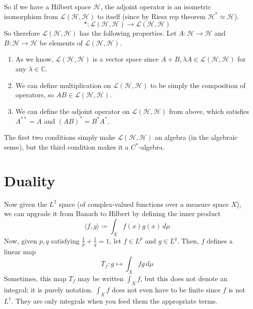 \documentclass{article}
\theoremstyle{remark}
\theoremstyle{definition}
\begin{document}
So if we have a Hilbert space $\mathcal{H}$, the adjoint operator is an isometric isomorphism from $\mathcal{L}(\mathcal{H}, \mathcal{H})$ to itself (since by Riesz rep theorem $\mathcal{H}^* \simeq \mathcal{H}$). 
\[\ast : \mathcal{L}(\mathcal{H}, \mathcal{H}) \longrightarrow \mathcal{L}(\mathcal{H}, \mathcal{H})\]
So therefore $\mathcal{L}(\mathcal{H}, \mathcal{H})$ has the following properties. Let $A: \mathcal{H} \longrightarrow \mathcal{H}$ and $B: \mathcal{H} \longrightarrow \mathcal{H}$ be elements of $\mathcal{L}(\mathcal{H}, \mathcal{H})$. 
\begin{enumerate}
    \item As we know, $\mathcal{L}(\mathcal{H}, \mathcal{H})$ is a vector space since $A + B, \lambda A \in \mathcal{L}(\mathcal{H}, \mathcal{H})$ for any $\lambda \in \mathbb{C}$. 
    \item We can define multiplication on $\mathcal{L}(\mathcal{H}, \mathcal{H})$ to be simply the composition of operators, so $AB \in \mathcal{L}(\mathcal{H}, \mathcal{H})$. 
    \item We can define the adjoint operator on $\mathcal{L}(\mathcal{H}, \mathcal{H})$ from above, which satisfies $A^{**} = A$ and $(AB)^* = B^* A^*$. 
\end{enumerate}
The first two conditions simply make $\mathcal{L}(\mathcal{H}, \mathcal{H})$ an algebra (in the algebraic sense), but the third condition makes it a $C^*$-algebra. 

\section{Duality}
Now given the $L^2$ space (of complex-valued functions over a measure space $X$), we can upgrade it from Banach to Hilbert by defining the inner product 
\[\langle f, g \rangle \coloneqq \int_X \overline{f(x)} g(x) \, d\mu\]
Now, given $p, q$ satisfying $\frac{1}{p} + \frac{1}{q} = 1$, let $f \in L^p$ and $g \in L^q$. Then, $f$ defines a linear map 
\[T_f: g \mapsto \int_X f g \, d\mu \]
Sometimes, this map $T_f$ may be written $\int_X f$, but this does not denote an integral; it is purely notation. $\int_X f$ does not even have to be finite since $f$ is not $L^1$. They are only integrals when you feed them the appropriate terms. 
\end{document}
